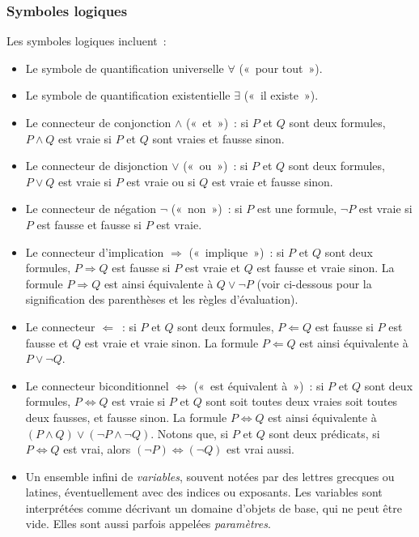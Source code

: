 \subsubsection{Symboles logiques}

Les symboles logiques incluent : 
\begin{itemize}
    \item Le symbole de quantification universelle $\forall$ (« pour tout »).\sindex[isy]{$\forall$}
    \item Le symbole de quantification existentielle $\exists$ (« il existe »).\sindex[isy]{$\exists$}
    \item Le connecteur de conjonction $\wedge$ (« et ») : si $P$ et $Q$ sont deux formules, $P \wedge Q$ est vraie si $P$ et $Q$ sont vraies et fausse sinon.\sindex[isy]{$\wedge$}
    \item Le connecteur de disjonction $\vee$ (« ou ») : si $P$ et $Q$ sont deux formules, $P \vee Q$ est vraie si $P$ est vraie ou si $Q$ est vraie et fausse sinon.\sindex[isy]{$\vee$}
    \item Le connecteur de négation $\neg$ (« non ») : si $P$ est une formule, $\neg P$ est vraie si $P$ est fausse et fausse si $P$ est vraie.\sindex[isy]{$\neg$}
    \item Le connecteur d'implication $\Rightarrow$ (« implique ») : si $P$ et $Q$ sont deux formules, $P \Rightarrow Q$ est fausse si $P$ est vraie et $Q$ est fausse et vraie sinon.\sindex[isy]{$\Rightarrow$} 
    La formule $P \Rightarrow Q$ est ainsi équivalente à $Q \vee \neg P$ (voir ci-dessous pour la signification des parenthèses et les règles d'évaluation).
    \item Le connecteur $\Leftarrow$ : si $P$ et $Q$ sont deux formules, $P \Leftarrow Q$ est fausse si $P$ est fausse et $Q$ est vraie et vraie sinon.\sindex[isy]{$\Leftarrow$} 
    La formule $P \Leftarrow Q$ est ainsi équivalente à $P \vee \neg Q$.
    \item Le connecteur biconditionnel $\Leftrightarrow$ (« est équivalent à ») : si $P$ et $Q$ sont deux formules, $P \Leftrightarrow Q$ est vraie si $P$ et $Q$ sont soit toutes deux vraies soit toutes deux fausses, et fausse sinon.\sindex[isy]{$\Leftrightarrow$} 
    La formule $P \Leftrightarrow Q$ est ainsi équivalente à $(P \wedge Q) \vee (\neg P \wedge \neg Q)$.
        Notons que, si $P$ et $Q$ sont deux prédicats, si $P \Leftrightarrow Q$ est vrai, alors $(\neg P) \Leftrightarrow (\neg Q)$ est vrai aussi.
    \item Un ensemble infini de \textit{variables}, souvent notées par des lettres grecques ou latines, éventuellement avec des indices ou exposants. 
    Les variables sont interprétées comme décrivant un domaine d'objets de base, qui ne peut être vide. 
    Elles sont aussi parfois appelées \textit{paramètres}. 
\end{itemize}


